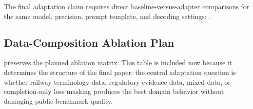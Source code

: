 

The final adaptation claim requires direct baseline-versus-adapter comparisons
for the same model, precision, prompt template, and decoding settings:
.

\subsection{Data-Composition Ablation Plan}

 preserves the planned ablation matrix. This table is
included now because it determines the structure of the final paper: the
central adaptation question is whether railway terminology data, regulatory
evidence data, mixed data, or completion-only loss masking produces the best
domain behavior without damaging public benchmark quality.


